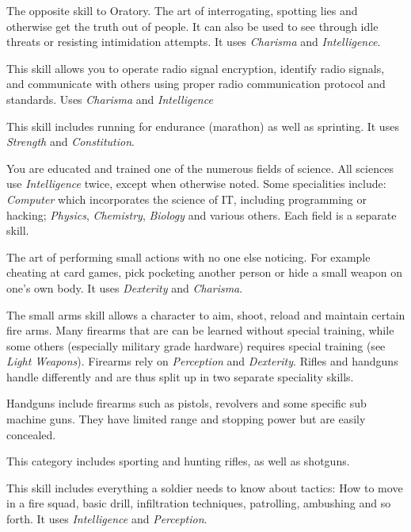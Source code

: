\begin{description}
   The opposite skill to Oratory. The art of interrogating,
  spotting lies and otherwise get the truth out of people. It can also be used
  to see through idle threats or resisting intimidation attempts. It uses
  \emph{Charisma} and \emph{Intelligence}.

   This skill allows you to operate radio signal
  encryption, identify radio signals, and communicate with others using proper
  radio communication protocol and standards. Uses \emph{Charisma} and
  \emph{Intelligence}

   This skill includes running for endurance (marathon) as well as
  sprinting. It uses \emph{Strength} and \emph{Constitution}.

   You are educated and trained one of the
  numerous fields of science. All sciences use \emph{Intelligence} twice, except
  when otherwise noted. Some specialities include: \emph{Computer} which
  incorporates the science of IT, including programming or hacking;
  \emph{Physics}, \emph{Chemistry}, \emph{Biology} and various others. Each
  field is a separate skill.

   The art of performing small actions with no one else
  noticing. For example cheating at card games, pick pocketing another person
  or hide a small weapon on one's own body. It uses \emph{Dexterity} and
  \emph{Charisma}.

   The small arms skill allows a character to aim, shoot,
  reload and maintain certain fire arms. Many firearms that are can be learned
  without special training, while some others (especially military grade
  hardware) requires special training (see \emph{Light Weapons}). Firearms rely
  on \emph{Perception} and \emph{Dexterity}. Rifles and handguns handle
  differently and are thus split up in two separate speciality skills.

   Handguns include firearms such as
  pistols, revolvers and some specific sub machine guns. They have limited range
  and stopping power but are easily concealed.

   This category includes sporting and
  hunting rifles, as well as shotguns.

   This skill includes everything a soldier needs to
  know about tactics: How to move in a fire squad, basic drill, infiltration
  techniques, patrolling, ambushing and so forth. It uses \emph{Intelligence} and
  \emph{Perception}.


\end{description}
